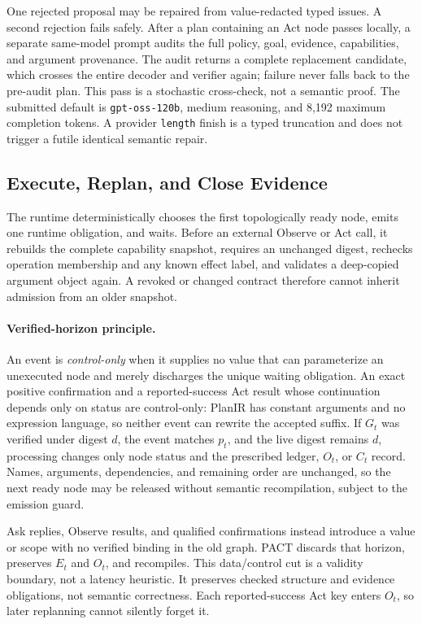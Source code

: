 \documentclass{article}
\begin{document}
One rejected proposal may be repaired from value-redacted typed issues.  A
second rejection fails safely.  After a plan containing an Act node passes
locally, a separate same-model prompt audits the full policy, goal, evidence,
capabilities, and argument provenance.  The audit returns a complete
replacement candidate, which crosses the entire decoder and verifier again;
failure never falls back to the pre-audit plan.  This pass is a stochastic
cross-check, not a semantic proof.  The submitted default is
\texttt{gpt-oss-120b}, medium reasoning, and 8,192 maximum completion tokens.
A provider \texttt{length} finish is a typed truncation and does not trigger a
futile identical semantic repair.

\subsection{Execute, Replan, and Close Evidence}

The runtime deterministically chooses the first topologically ready node,
emits one runtime obligation, and waits.  Before an external Observe or Act
call, it rebuilds the complete capability snapshot, requires an unchanged
digest, rechecks operation membership and any known effect label, and validates
a deep-copied argument object again.  A revoked or changed contract therefore
cannot inherit admission from an older snapshot.

\paragraph{Verified-horizon principle.}
An event is \emph{control-only} when it supplies no value that can parameterize
an unexecuted node and merely discharges the unique waiting obligation.  An
exact positive confirmation and a reported-success Act result whose
continuation depends only on status are control-only: PlanIR has constant
arguments and no expression language, so neither event can rewrite the
accepted suffix.  If $G_t$ was verified under digest $d$, the event matches
$p_t$, and the live digest remains $d$, processing changes only node status and
the prescribed ledger, $O_t$, or $C_t$ record.  Names, arguments,
dependencies, and remaining order are unchanged, so the next ready node may be
released without semantic recompilation, subject to the emission guard.

Ask replies, Observe results, and qualified confirmations instead introduce a
value or scope with no verified binding in the old graph.  PACT discards that
horizon, preserves $E_t$ and $O_t$, and recompiles.  This data/control cut is a
validity boundary, not a latency heuristic.  It preserves checked structure
and evidence obligations, not semantic correctness.  Each reported-success Act
key enters $O_t$, so later replanning cannot silently forget it.
\end{document}

